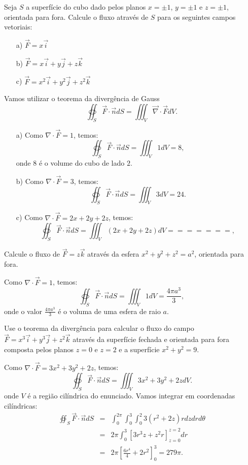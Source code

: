 \begin{exeresol} Seja $S$ a superfície do cubo dado pelos planos $x=\pm 1$, $y=\pm 1$ e $z=\pm 1$, orientada para fora. Calcule o fluxo através de $S$ para os seguintes campos vetoriais:
\begin{itemize}
 \item[a)]$\vec{F}=x\vec{i}$
 \item[b)]$\vec{F}=x\vec{i}+y\vec{j}+z\vec{k}$
 \item[c)]$\vec{F}=x^2\vec{i}+y^2\vec{j}+z^2\vec{k}$
 \end{itemize}
\end{exeresol}
\begin{resol}
Vamos utilizar o teorema da divergência de Gauss
$$
\oiint_S \vec{F}\cdot \vec{n} dS=\iiint_V \vec{\nabla}\cdot \vec{F} dV.
$$
\begin{itemize}
 \item[a)] Como $\nabla\cdot \vec{F}=1$, temos: 
$$
\oiint_S \vec{F}\cdot \vec{n} dS=\iiint_V 1 dV=8,
$$
 onde $8$ é o volume do cubo de lado $2$.
 \item[b)] Como $\nabla\cdot \vec{F}=3$, temos: 
$$
\oiint_S \vec{F}\cdot \vec{n} dS=\iiint_V 3 dV=24.
$$
 \item[c)] Como $\nabla\cdot \vec{F}=2x+2y+2z$, temos: 
$$
\oiint_S \vec{F}\cdot \vec{n} dS=\iiint_V (2x+2y+2z) dV=======,
$$

 \end{itemize}


\end{resol}

\begin{exeresol} Calcule o fluxo de $\vec{F}=z\vec{k}$ através da esfera $x^2+y^2+z^2= a^2$, orientada para fora. \end{exeresol}
\begin{resol}
Como $\nabla\cdot \vec{F}=1$, temos: 
$$
\oiint_S \vec{F}\cdot \vec{n} dS=\iiint_V 1 dV=\frac{4\pi a^3}{3},
$$
onde o valor $\frac{4\pi a^3}{3}$ é o voluma de uma esfera de raio $a$.
\end{resol}

\begin{exeresol} Use o teorema da divergência para calcular o fluxo do campo $\vec{F}=x^3\vec{i}+y^3\vec{j}+z^2\vec{k}$ através da superfície fechada e orientada para fora composta pelos planos $z=0$ e $z=2$ e a superfície $x^2+y^2= 9$.
\end{exeresol}
\begin{resol}
Como $\nabla\cdot \vec{F}=3x^2+3y^2+2z$, temos: 
$$
\oiint_S \vec{F}\cdot \vec{n} dS=\iiint_V 3x^2+3y^2+2z dV.
$$
onde $V$ é a região cilíndrica do enunciado. Vamos integrar em coordenadas cilíndricas:
\begin{eqnarray*}
\oiint_S \vec{F}\cdot \vec{n} dS&=&\int_0^{2\pi} \int_0^3 \int_0^2 3 (r^2+2z )r dzdrd\theta\\
&=&2\pi \int_0^3 \left[ 3 r^3z+z^2r \right]_{z=0}^{z=2}dr\\
&=&2\pi  \left[ \frac{6r^4}{4} +2r^2 \right]_{0}^{3}=279\pi. 
\end{eqnarray*}
\end{resol}

